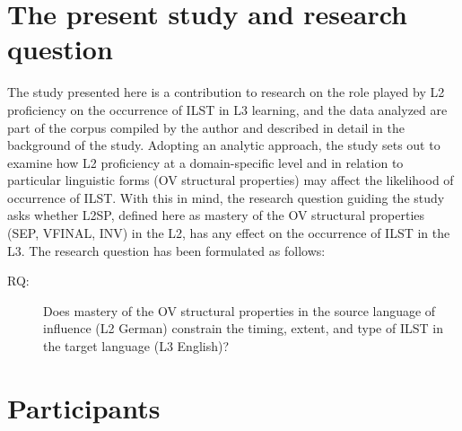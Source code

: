 \documentclass[output=paper,modfonts,nonflat, newtxmath]{langsci/langscibook}
\begin{document}
\section{The present study and research question}
\label{sec:sanchez7:3}

The study presented here is a contribution to research on the role played by L2 proficiency on the occurrence of ILST in L3 learning, and the data analyzed are part of the corpus compiled by the author and described in detail in the background of the study. Adopting an analytic approach, the study sets out to examine how L2 proficiency at a domain-specific level and in relation to particular linguistic forms (OV structural properties) may affect the likelihood of occurrence of ILST. With this in mind, the research question guiding the study asks whether L2SP, defined here as mastery of the OV structural properties (SEP, VFINAL, INV) in the L2, has any effect on the occurrence of ILST in the L3. The research question has been formulated as follows:

\begin{description}
\item[RQ:] Does mastery of the OV structural properties in the source language of influence (L2 German) constrain the timing, extent, and type of ILST in the target language (L3 English)?
\end{description}

\section{Participants}
\end{document}
